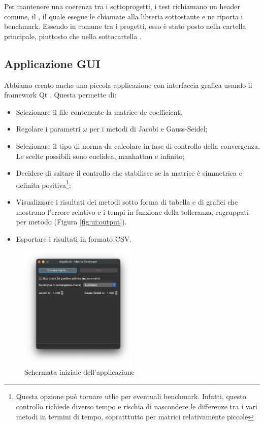Per mantenere una coerenza tra i sottoprogetti, i test richiamano un header comune, il , il quale esegue le chiamate alla libreria sottostante e ne riporta i benchmark. Essendo in comune tra i progetti, esso è stato posto nella cartella principale, piuttosto che nella sottocartella .


\subsection{Applicazione GUI}
Abbiamo creato anche una piccola applicazione con interfaccia grafica usando il framework Qt \cite{Qt}. Questa permette di:
\begin{itemize}
	\item Selezionare il file contenente la matrice de coefficienti
	\item Regolare i parametri $\omega$ per i metodi di Jacobi e Gauss-Seidel;
	\item Selezionare il tipo di norma da calcolare in fase di controllo della convergenza. Le scelte possibili sono euclidea, manhattan e infinito;
	\item Decidere di saltare il controllo che stabilisce se la matrice è simmetrica e definita positiva\footnote{Questa opzione può tornare utlie per eventuali benchmark. Infatti, questo controllo richiede diverso tempo e rischia di nascondere le differenze tra i vari metodi in termini di tempo, sopratttutto per matrici relativamente piccole};
	\item Visualizzare i risultati dei metodi sotto forma di tabella e di grafici che mostrano l'errore relativo e i tempi in funzione della tolleranza, ragruppati per metodo (Figura \ref{fig:ui:output}).
	\item Esportare i risultati in formato CSV.
\end{itemize}

\begin{figure}%
	\centering
	\includegraphics[width=0.5\textwidth]{figures/UI/main.png}
	\caption{Schermata iniziale dell'applicazione}%
	\label{fig:ui:main}%
\end{figure}

